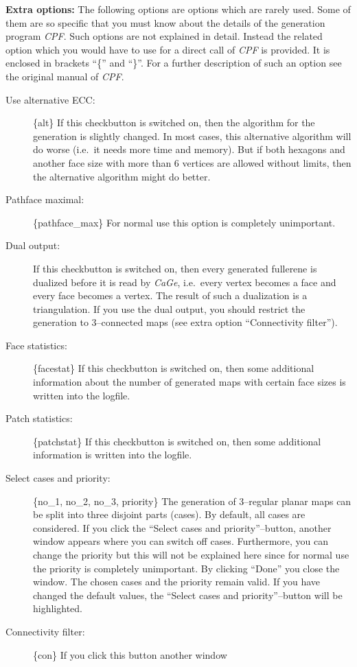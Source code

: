 \documentclass[a4paper]{article}
\def\CaGe{\textit{CaGe}}
\begin{document}
\noindent\textbf{Extra options:} 
The following options are options which are rarely
used. Some of them are so specific that you must know about the details of the
generation program \textit{CPF}. Such options are not explained in detail.
Instead the related option which you would have to use for a direct call of 
\textit{CPF} is provided. It is enclosed in brackets ``\{'' and ``\}''.
For a further description of such an option see the original manual of
\textit{CPF}.
\begin{description}
\item[Use alternative ECC:] \{alt\} If this checkbutton is switched on, then
the algorithm for the generation is slightly changed. In most cases, this 
alternative algorithm will do worse (i.e.~it needs more time and memory). But
if both hexagons and another face size with more than 6 vertices are allowed
without limits, then the alternative algorithm might do better. 
\item[Pathface maximal:] \{pathface\_max\} For normal use this option is
completely unimportant.
\item[Dual output:] If this checkbutton is switched on, then every generated
fullerene is dualized before it is read by \CaGe{}, i.e.~every vertex becomes
a face and every face becomes a vertex. The result of such a dualization is a 
triangulation. If you use the dual output, you should restrict the generation
to 3--connected maps (see extra option ``Connectivity filter'').
\item[Face statistics:] \{facestat\} If this checkbutton is switched on, 
then some 
additional information about the number of generated maps with certain face
sizes is written into the logfile.
\item[Patch statistics:] \{patchstat\} If this checkbutton is switched on,
then some additional information is written into the logfile.
\item[Select cases and priority:] \{no\_1, no\_2, no\_3, priority\}
The generation of 3--regular planar maps can be split into
three disjoint parts (cases). By default, all cases are considered. If you
click the ``Select cases and priority''--button, another window appears where
you can switch off cases. Furthermore, you can change the priority but this
will not be explained here since for normal use the priority is completely
unimportant. By clicking ``Done'' you close the window. The chosen cases
and the priority remain valid. If you have changed the default values, the
``Select cases and priority''--button will be highlighted.
\item[Connectivity filter:] \{con\} If you click this button another window 

\end{description}
\end{document}
